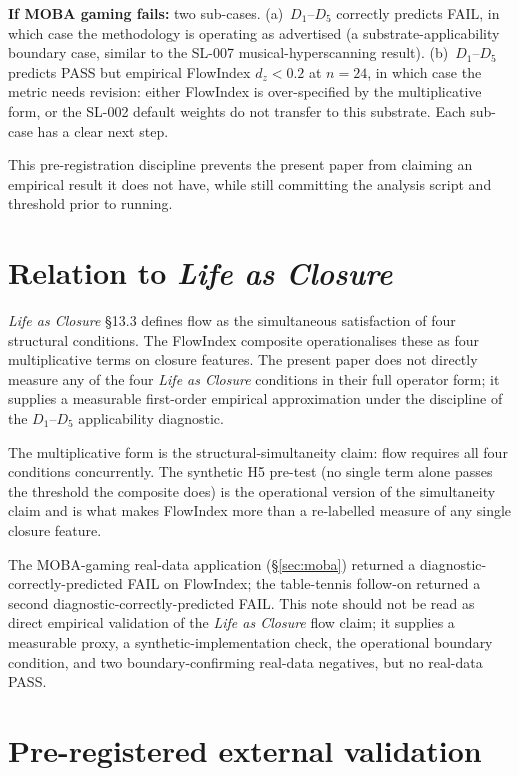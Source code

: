 \documentclass[11pt,a4paper]{article}
\begin{document}
\textbf{If MOBA gaming fails:} two sub-cases. (a)~$D_1$--$D_5$ correctly predicts FAIL, in which case the methodology is operating as advertised (a substrate-applicability boundary case, similar to the SL-007 musical-hyperscanning result). (b)~$D_1$--$D_5$ predicts PASS but empirical FlowIndex $d_z < 0.2$ at $n = 24$, in which case the metric needs revision: either FlowIndex is over-specified by the multiplicative form, or the SL-002 default weights do not transfer to this substrate. Each sub-case has a clear next step.

This pre-registration discipline prevents the present paper from claiming an empirical result it does not have, while still committing the analysis script and threshold prior to running.

\section{Relation to \emph{Life as Closure}}\label{sec:relation-life}

\emph{Life as Closure} \S 13.3 \citep{SmartLifeAsClosure} defines flow as the simultaneous satisfaction of four structural conditions. The FlowIndex composite operationalises these as four multiplicative terms on closure features. The present paper does not directly measure any of the four \emph{Life as Closure} conditions in their full operator form; it supplies a measurable first-order empirical approximation under the discipline of the $D_1$--$D_5$ applicability diagnostic.

The multiplicative form is the structural-simultaneity claim: flow requires all four conditions concurrently. The synthetic H5 pre-test (no single term alone passes the threshold the composite does) is the operational version of the simultaneity claim and is what makes FlowIndex more than a re-labelled measure of any single closure feature.

The MOBA-gaming real-data application (\S\ref{sec:moba}) returned a diagnostic-correctly-predicted FAIL on FlowIndex; the table-tennis follow-on returned a second diagnostic-correctly-predicted FAIL. This note should not be read as direct empirical validation of the \emph{Life as Closure} flow claim; it supplies a measurable proxy, a synthetic-implementation check, the operational boundary condition, and two boundary-confirming real-data negatives, but no real-data PASS.

\section{Pre-registered external validation}\label{sec:external}
\end{document}
